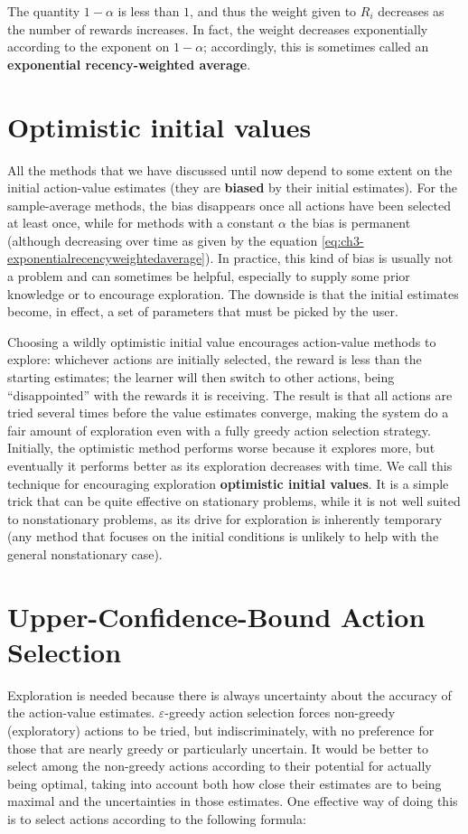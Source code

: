 The quantity $1 - \alpha$ is less than $1$, and thus the weight given to $R_i$ decreases as the number of rewards increases. In fact, the weight decreases exponentially according to the exponent on $1 - \alpha$; accordingly, this is sometimes called an \textbf{exponential recency-weighted average}.

\section{Optimistic initial values}
All the methods that we have discussed until now depend to some extent on the initial action-value estimates (they are \textbf{biased} by their initial estimates). For the sample-average methods, the bias disappears once all actions have been selected at least once, while for methods with a constant $\alpha$ the bias is permanent (although decreasing over time as given by the equation \ref{eq:ch3-exponentialrecencyweightedaverage}). In practice, this kind of bias is usually not a problem and can sometimes be helpful, especially to supply some prior knowledge or to encourage exploration. The downside is that the initial estimates become, in effect, a set of parameters that must be picked by the user.

Choosing a wildly optimistic initial value encourages action-value methods to explore: whichever actions are initially selected, the reward is less than the starting estimates; the learner will then switch to other actions, being ``disappointed'' with the rewards it is receiving. The result is that all actions are tried several times before the value estimates converge, making the system do a fair amount of exploration even with a fully greedy action selection strategy. Initially, the optimistic method performs worse because it explores more, but eventually it performs better as its exploration decreases with time. We call this technique for encouraging exploration \textbf{optimistic initial values}. It is a simple trick that can be quite effective on stationary problems, while it is not well suited to nonstationary problems, as its drive for exploration is inherently temporary (any method that focuses on the initial conditions is unlikely to help with the general nonstationary case).

\section{Upper-Confidence-Bound Action Selection}
Exploration is needed because there is always uncertainty about the accuracy of the action-value estimates. $\varepsilon$-greedy action selection forces non-greedy (exploratory) actions to be tried, but indiscriminately, with no preference for those that are nearly greedy or particularly uncertain. It would be better to select among the non-greedy actions according to their potential for actually being optimal, taking into account both how close their estimates are to being maximal and the uncertainties in those estimates. One effective way of doing this is to select actions according to the following formula:

